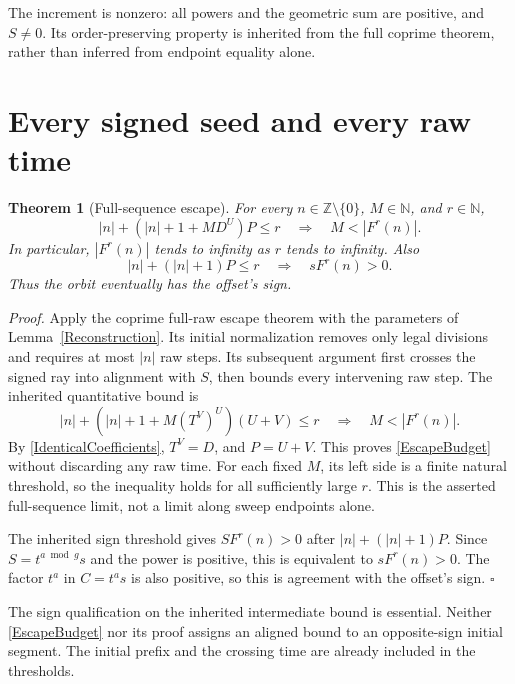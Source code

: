 \documentclass[11pt,letterpaper]{article}
\newcommand{\N}{\mathbb{N}}
\newcommand{\Z}{\mathbb{Z}}
\newtheorem{theorem}{Theorem}
\newenvironment{proof}{\noindent\textit{Proof.}}{\hfill\(\square\)}
\begin{document}
The increment is nonzero: all powers and the geometric sum are positive,
and \(S\ne0\). Its order-preserving property is inherited from the full
coprime theorem, rather than inferred from endpoint equality alone.

\section{Every signed seed and every raw time}

\begin{theorem}[Full-sequence escape]\label{Escape}
For every \(n\in\Z\setminus\{0\}\), \(M\in\N\), and \(r\in\N\),
\begin{equation}\label{EscapeBudget}
|n|+(|n|+1+M D^U)P\le r
\quad\Longrightarrow\quad
M<|F^r(n)|.
\end{equation}
In particular, \(|F^r(n)|\) tends to infinity as \(r\) tends to infinity.
Also
\begin{equation}\label{SignBudget}
|n|+(|n|+1)P\le r
\quad\Longrightarrow\quad
sF^r(n)>0.
\end{equation}
Thus the orbit eventually has the offset's sign.
\end{theorem}

\begin{proof}
Apply the coprime full-raw escape theorem with the parameters of
Lemma~\ref{Reconstruction}. Its initial normalization removes only legal
divisions and requires at most \(|n|\) raw steps. Its subsequent argument
first crosses the signed ray into alignment with \(S\), then bounds every
intervening raw step. The inherited quantitative bound is
\[
|n|+(|n|+1+M(T^V)^U)(U+V)\le r
\quad\Longrightarrow\quad M<|F^r(n)|.
\]
By \eqref{IdenticalCoefficients}, \(T^V=D\), and \(P=U+V\).
This proves \eqref{EscapeBudget} without discarding any raw time.
For each fixed \(M\), its left side is a finite natural threshold, so the
inequality holds for all sufficiently large \(r\). This is the asserted
full-sequence limit, not a limit along sweep endpoints alone.

The inherited sign threshold gives \(S F^r(n)>0\) after
\(|n|+(|n|+1)P\). Since \(S=t^{a\bmod g}s\) and the power is positive, this
is equivalent to \(sF^r(n)>0\). The factor \(t^a\) in \(C=t^a s\) is
also positive, so this is agreement with the offset's sign.
\end{proof}

The sign qualification on the inherited intermediate bound is essential.
Neither \eqref{EscapeBudget} nor its proof assigns an aligned bound to an
opposite-sign initial segment. The initial prefix and the crossing time
are already included in the thresholds.
\end{document}
